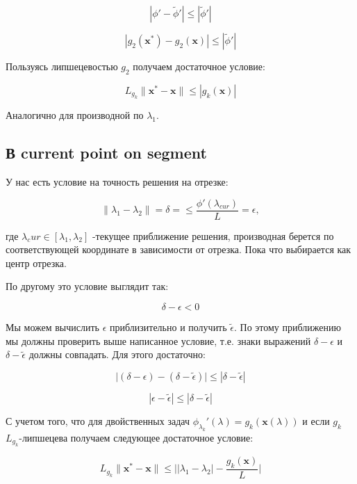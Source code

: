 \documentclass[12pt]{article}
\begin{document}
$$|\phi' - \tilde{\phi}'|\leq |\tilde{\phi}'|$$

$$|g_2(\textbf{x}^*)-g_2(\textbf{x})|\leq |\tilde{\phi}'|$$

Пользуясь липшецевостью $g_2$ получаем достаточное условие:

$$\boxed{L_{g_k}\|\textbf{x}^*-\textbf{x}\|\leq |g_k(\textbf{x})|}$$

Аналогично для производной по $\lambda_1$.

\subsection{В current point on segment}

У нас есть условие на точность решения на отрезке:

$$\|\lambda_1-\lambda_2\|=\delta = \leq \frac{\phi'(\lambda_{cur})}{L}=\epsilon,$$

где $\lambda_cur\in[\lambda_1, \lambda_2]$ -текущее приближение решения, производная берется по соответствующей координате в зависимости от отрезка. Пока что выбирается как центр отрезка.

По другому это условие выглядит так:

$$\delta-\epsilon<0$$

Мы можем вычислить $\epsilon$ приблизительно и получить $\tilde{\epsilon}$. По этому приближению мы должны проверить выше написанное условие, т.е. знаки выражений $\delta-\epsilon$ и $\delta - \tilde{\epsilon}$ должны совпадать. Для этого достаточно:

$$\Big|(\delta-\epsilon)-(\delta - \tilde{\epsilon})\Big|\leq |\delta - \tilde{\epsilon}|$$

$$|\epsilon-\tilde{\epsilon}|\leq |\delta - \tilde{\epsilon}|$$

С учетом того, что для двойственных задач $\phi_{\lambda_k}'(\lambda)=g_k\left(\textbf{x}(\lambda)\right)$ и если $g_k$ $L_{g_k}$-липшецева получаем следующее достаточное условие:

$$\boxed{L_{g_k}\|\textbf{x}^*-\textbf{x}\|}\leq \Big||\lambda_1-\lambda_2| - \frac{g_k(\textbf{x})}{L}\Big|$$
\end{document}
